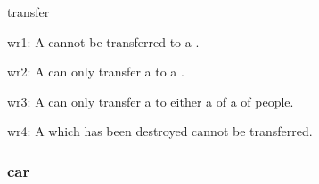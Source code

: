 \documentclass{article}
\begin{document}
\begin{Mnamedesc}{transfer}
\begin{Mprops}
\item[wr1:] A  cannot be transferred to a .

\item[wr2:] A  can only transfer a  to a
.

\item[wr3:] A  can only transfer a  to either a
 of a  of people.

\item[wr4:] A  which has been destroyed cannot be
transferred.
\end{Mprops}
\end{Mnamedesc}

\subsubsection{car}
\end{document}
